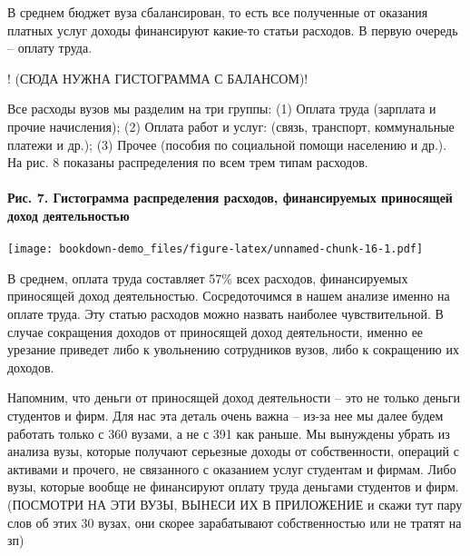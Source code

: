 \documentclass[]{book}
\let\oldparagraph\paragraph
\renewcommand{\paragraph}[1]{\oldparagraph{#1}\mbox{}}
\begin{document}
В среднем бюджет вуза сбалансирован, то есть все полученные от оказания платных услуг доходы финансируют какие-то статьи расходов. В первую очередь -- оплату труда.

! (СЮДА НУЖНА ГИСТОГРАММА С БАЛАНСОМ)!

Все расходы вузов мы разделим на три группы: (1) Оплата труда (зарплата и прочие начисления); (2) Оплата работ и услуг: (связь, транспорт, коммунальные платежи и др.); (3) Прочее (пособия по социальной помощи населению и др.). На рис. 8 показаны распределения по всем трем типам расходов.

\hypertarget{ux440ux438ux441.-7.-ux433ux438ux441ux442ux43eux433ux440ux430ux43cux43cux430-ux440ux430ux441ux43fux440ux435ux434ux435ux43bux435ux43dux438ux44f-ux440ux430ux441ux445ux43eux434ux43eux432-ux444ux438ux43dux430ux43dux441ux438ux440ux443ux435ux43cux44bux445-ux43fux440ux438ux43dux43eux441ux44fux449ux435ux439-ux434ux43eux445ux43eux434-ux434ux435ux44fux442ux435ux43bux44cux43dux43eux441ux442ux44cux44e}{%
\paragraph{Рис. 7. Гистограмма распределения расходов, финансируемых приносящей доход деятельностью}\label{ux440ux438ux441.-7.-ux433ux438ux441ux442ux43eux433ux440ux430ux43cux43cux430-ux440ux430ux441ux43fux440ux435ux434ux435ux43bux435ux43dux438ux44f-ux440ux430ux441ux445ux43eux434ux43eux432-ux444ux438ux43dux430ux43dux441ux438ux440ux443ux435ux43cux44bux445-ux43fux440ux438ux43dux43eux441ux44fux449ux435ux439-ux434ux43eux445ux43eux434-ux434ux435ux44fux442ux435ux43bux44cux43dux43eux441ux442ux44cux44e}}

\texttt{[image: bookdown-demo\_files/figure-latex/unnamed-chunk-16-1.pdf]}

В среднем, оплата труда составляет 57\% всех расходов, финансируемых приносящей доход деятельностью. Сосредоточимся в нашем анализе именно на оплате труда. Эту статью расходов можно назвать наиболее чувствительной. В случае сокращения доходов от приносящей доход деятельности, именно ее урезание приведет либо к увольнению сотрудников вузов, либо к сокращению их доходов.

Напомним, что деньги от приносящей доход деятельности -- это не только деньги студентов и фирм. Для нас эта деталь очень важна -- из-за нее мы далее будем работать только с 360 вузами, а не с 391 как раньше. Мы вынуждены убрать из анализа вузы, которые получают серьезные доходы от собственности, операций с активами и прочего, не связанного с оказанием услуг студентам и фирмам. Либо вузы, которые вообще не финансируют оплату труда деньгами студентов и фирм. (ПОСМОТРИ НА ЭТИ ВУЗЫ, ВЫНЕСИ ИХ В ПРИЛОЖЕНИЕ и скажи тут пару слов об этих 30 вузах, они скорее зарабатывают собственностью или не тратят на зп)
\end{document}
